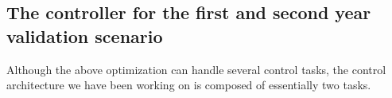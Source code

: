 \subsection{The controller for the first and second year validation scenario} 
\label{sec:firstSecondValid}
Although the above optimization can handle several control tasks, the control architecture we have been working on is composed of essentially two tasks.
\begin{figure}[t]
\end{figure}

